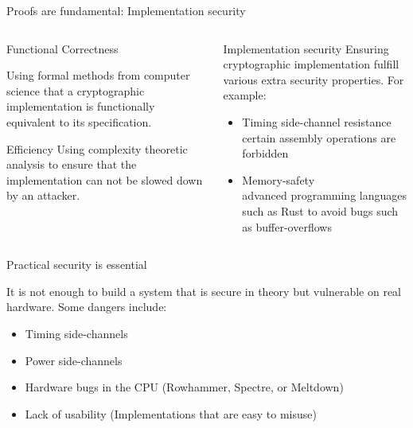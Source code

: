 \begin{frame}{Proofs are fundamental: Implementation security}
  \begin{columns}[t]

    \begin{column}{.5\linewidth}
      \begin{block}{Functional Correctness\rule[-.5\dp\strutbox]{0pt}{.5\dp\strutbox}}%
        Using formal methods from computer science that a cryptographic implementation is functionally equivalent to its specification.
      \end{block}

      \begin{block}{Efficiency}
        Using complexity theoretic analysis to ensure that the implementation can not be slowed down by an attacker.
      \end{block}
    \end{column}

    \begin{column}{.5\linewidth}
      \begin{block}{Implementation security}
        Ensuring cryptographic implementation fulfill various extra security properties.
        For example:
        \vfill
        \begin{itemize}
          \item Timing side-channel resistance\\
          \small certain assembly operations are forbidden
          \item Memory-safety\\
          \small advanced programming languages such as Rust to avoid bugs such as buffer-overflows
        \end{itemize}
      \end{block}
    \end{column}
  \end{columns}

\end{frame}

\begin{frame}{Practical security is essential}
  \small

  It is not enough to build a system that is secure in theory but vulnerable on real hardware.
  Some dangers include:

  \begin{itemize}
    \item Timing side-channels
    \item Power side-channels
    \item Hardware bugs in the CPU (Rowhammer, Spectre, or Meltdown)
    \item Lack of usability (Implementations that are easy to misuse)
  \end{itemize}
\end{frame}

